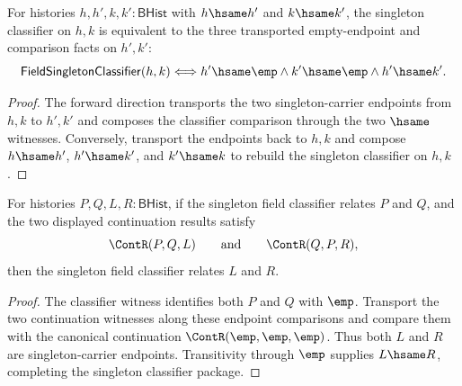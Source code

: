 \begin{theorem}
\label{thm:field-singleton-classifier-hsame-empty-endpoints}
For histories $h,h',k,k':\mathsf{BHist}$ with $h\hsame h'$ and $k\hsame k'$,
the singleton classifier on $h,k$ is equivalent to the three transported
empty-endpoint and comparison facts on $h',k'$:
$$
\mathsf{FieldSingletonClassifier}(h,k)
\Longleftrightarrow
h'\hsame\emp\land k'\hsame\emp\land h'\hsame k'.
$$
\end{theorem}
\begin{proof}
The forward direction transports the two singleton-carrier endpoints from
$h,k$ to $h',k'$ and composes the classifier comparison through the two
$\hsame$ witnesses. Conversely, transport the endpoints back to $h,k$ and
compose $h\hsame h'$, $h'\hsame k'$, and $k'\hsame k$ to rebuild the
singleton classifier on $h,k$.
\end{proof}

\begin{theorem}
\label{thm:field-singleton-classifier-continuation-comm-closed}
For histories $P,Q,L,R:\mathsf{BHist}$, if the singleton field classifier
relates $P$ and $Q$, and the two displayed continuation results satisfy
$$
\ContR(P,Q,L)
\qquad\text{and}\qquad
\ContR(Q,P,R),
$$
then the singleton field classifier relates $L$ and $R$.
\end{theorem}
\begin{proof}
The classifier witness identifies both $P$ and $Q$ with $\emp$. Transport the
two continuation witnesses along these endpoint comparisons and compare them
with the canonical continuation $\ContR(\emp,\emp,\emp)$. Thus both $L$ and
$R$ are singleton-carrier endpoints. Transitivity through $\emp$ supplies
$L\hsame R$, completing the singleton classifier package.
\end{proof}

